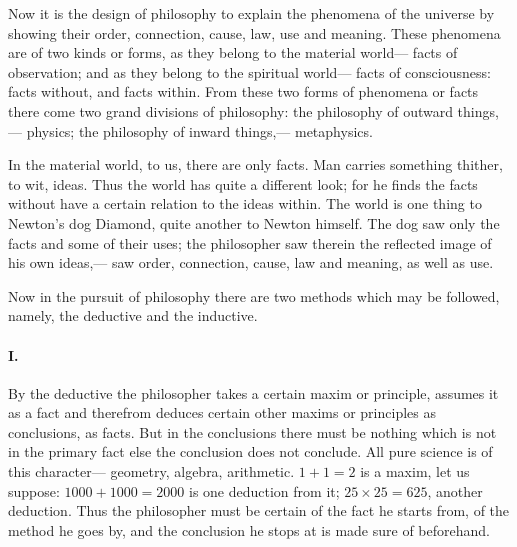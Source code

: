 \documentclass[12pt]{article}
\begin{document}
Now it is the design of philosophy to explain the phenomena of the universe by showing their order, connection, cause, law, use and meaning. These phenomena are of two kinds or forms, as they belong to the material world--- facts of observation; and as they belong to the spiritual world--- facts of consciousness: facts without, and facts within. From these two forms of phenomena or facts there come two grand divisions of philosophy: the philosophy of outward things,--- physics; the philosophy of inward things,--- metaphysics. 

In the material world, to us, there are only facts. Man carries something thither, to wit, ideas. Thus the world has quite a different look; for he finds the facts without have a certain relation to the ideas within. The world is one thing to Newton's dog Diamond, quite another to Newton himself. The dog saw only the facts and some of their uses; the philosopher saw therein the reflected image of his own ideas,--- saw order, connection, cause, law and meaning, as well as use. 

Now in the pursuit of philosophy there are two methods which may be followed, namely, the deductive and the inductive. 

\paragraph{I.} By the deductive the philosopher takes a certain maxim or principle, assumes it as a fact and therefrom deduces certain other maxims or principles as conclusions, as facts. But in the conclusions there must be nothing which is not in the primary fact else the conclusion does not conclude. All pure science is of this character--- geometry, algebra, arithmetic. $1+1 = 2$ is a maxim, let us suppose: $1000 + 1000 = 2000$ is one deduction from it; $25 {\times} 25 = 625$, another deduction. Thus the philosopher must be certain of the fact he starts from, of the method he goes by, and the conclusion he stops at is made sure of beforehand. 
\end{document}
